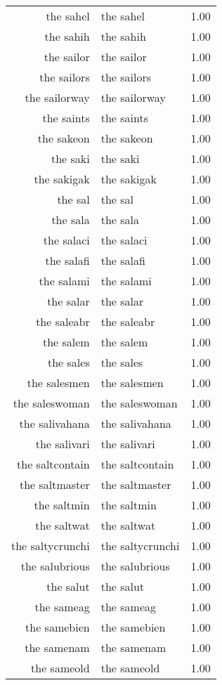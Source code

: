 \begin{table}[ht]
\begin{tabular}{rlr}
  the sahel & the sahel & 1.00 \\ 
  the sahih & the sahih & 1.00 \\ 
  the sailor & the sailor & 1.00 \\ 
  the sailors & the sailors & 1.00 \\ 
  the sailorway & the sailorway & 1.00 \\ 
  the saints & the saints & 1.00 \\ 
  the sakeon & the sakeon & 1.00 \\ 
  the saki & the saki & 1.00 \\ 
  the sakigak & the sakigak & 1.00 \\ 
  the sal & the sal & 1.00 \\ 
  the sala & the sala & 1.00 \\ 
  the salaci & the salaci & 1.00 \\ 
  the salafi & the salafi & 1.00 \\ 
  the salami & the salami & 1.00 \\ 
  the salar & the salar & 1.00 \\ 
  the saleabr & the saleabr & 1.00 \\ 
  the salem & the salem & 1.00 \\ 
  the sales & the sales & 1.00 \\ 
  the salesmen & the salesmen & 1.00 \\ 
  the saleswoman & the saleswoman & 1.00 \\ 
  the salivahana & the salivahana & 1.00 \\ 
  the salivari & the salivari & 1.00 \\ 
  the saltcontain & the saltcontain & 1.00 \\ 
  the saltmaster & the saltmaster & 1.00 \\ 
  the saltmin & the saltmin & 1.00 \\ 
  the saltwat & the saltwat & 1.00 \\ 
  the saltycrunchi & the saltycrunchi & 1.00 \\ 
  the salubrious & the salubrious & 1.00 \\ 
  the salut & the salut & 1.00 \\ 
  the sameag & the sameag & 1.00 \\ 
  the samebien & the samebien & 1.00 \\ 
  the samenam & the samenam & 1.00 \\ 
  the sameold & the sameold & 1.00 \\ 

\end{tabular}
\end{table}
